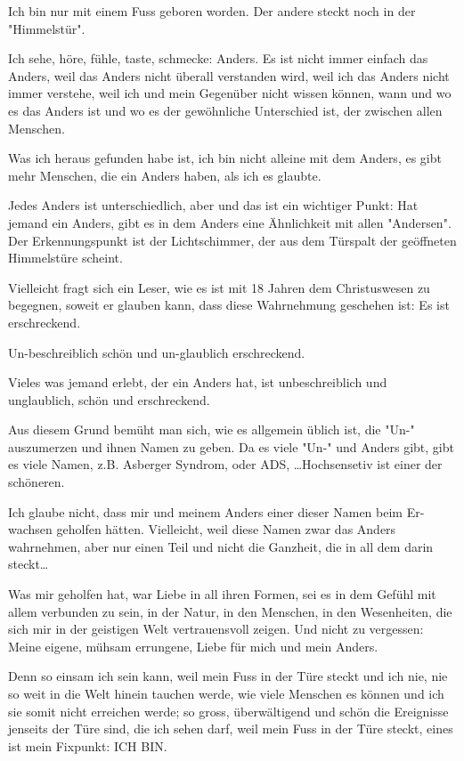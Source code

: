 \documentclass[10pt,titlepage,a5paper]{book}
\begin{document}
 Ich bin nur mit einem Fuss geboren worden. Der andere steckt noch in der "Himmelstür". 
 
 Ich sehe, höre, fühle, taste, schmecke: Anders.
 Es ist nicht immer einfach das Anders, weil das Anders nicht überall verstanden wird, weil ich das Anders nicht immer verstehe, weil ich und mein Gegenüber nicht wissen können, wann und wo es das Anders ist und wo es der gewöhnliche Unterschied ist, der zwischen allen Menschen. 
 
 Was ich heraus gefunden habe ist, ich bin nicht alleine mit dem Anders, es gibt mehr Menschen, die ein Anders haben, als ich es glaubte.
 
 Jedes Anders ist unterschiedlich, aber und das ist ein wichtiger Punkt: Hat jemand ein Anders, gibt es in dem Anders eine Ähnlichkeit mit allen "{}Andersen". Der Erkennungspunkt ist der Lichtschimmer, der aus dem Türspalt der geöffneten Himmelstüre scheint.
 
 Vielleicht fragt sich ein Leser, wie es ist mit 18 Jahren dem Christuswesen zu begegnen, soweit er glauben kann, dass diese Wahrnehmung geschehen ist: Es ist erschreckend.
 
 Un-beschreiblich schön und un-glaublich erschreckend.
 
 Vieles was jemand erlebt, der ein Anders hat, ist unbeschreiblich und unglaublich, schön und erschreckend.
 
 Aus diesem Grund bemüht man sich, wie es allgemein üblich ist, die "{}Un-"{} auszumerzen und ihnen Namen zu geben. Da es viele "{}Un-"{} und Anders gibt, gibt es viele Namen, z.B. Asberger Syndrom, oder ADS, \dots   Hochsensetiv ist einer der schöneren.
 
 Ich glaube nicht, dass mir und meinem Anders einer dieser Namen beim Er-wachsen geholfen hätten. Vielleicht, weil diese Namen zwar das Anders wahrnehmen, aber nur einen Teil und nicht die Ganzheit, die in all dem darin steckt\dots 
 
 Was mir geholfen hat, war Liebe in all ihren Formen, sei es in dem Gefühl mit allem verbunden zu sein, in der Natur, in den Menschen, in den Wesenheiten, die sich mir in der geistigen Welt vertrauensvoll zeigen. Und nicht zu vergessen: Meine eigene, mühsam errungene, Liebe für mich und mein Anders.
 
 Denn so einsam ich sein kann, weil mein Fuss in der Türe steckt und ich nie, nie so weit in die Welt hinein tauchen werde, wie viele Menschen es können und ich sie somit nicht erreichen werde; so gross, überwältigend und schön die Ereignisse jenseits der Türe sind, die ich sehen darf, weil mein Fuss in der Türe steckt, eines ist mein Fixpunkt: ICH BIN.
 
\end{document}
